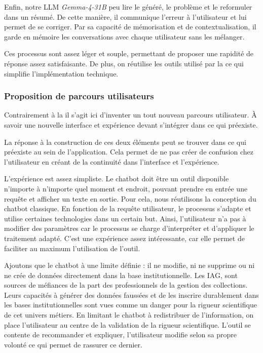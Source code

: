 Enfin, notre \gls{LLM} \textit{Gemma-4-31B} peu lire le \J généré,  le problème et le reformuler dans un résumé. De cette manière, il communique l'erreur à l'utilisateur et lui permet de se corriger. Par sa capacité de mémorisation et de contextualisation, il garde en mémoire les conversations avec chaque utilisateur sans les mélanger.\newline

Ces processus sont assez léger et souple, permettant de proposer une rapidité de réponse assez satisfaisante. De plus, on réutilise les outils utilisé par la  ce qui simplifie l'implémentation technique. 

\subsubsection{Proposition de parcours utilisateurs}

Contrairement à la  il s'agit ici d'inventer un tout nouveau parcours utilisateur. À savoir une nouvelle interface et expérience devant s'intégrer dans ce qui préexiste. 

La réponse à la construction de ces deux éléments peut se trouver dans ce qui préexiste au sein de l'application. Cela permet de ne pas créer de confusion chez l'utilisateur en créant de la continuité dans l'interface et l'expérience.\newline

L'expérience est assez simpliste. Le \gls{chatbot} doit être un outil disponible n'importe à n'importe quel moment et endroit, pouvant prendre en entrée une requête et afficher un texte en sortie. Pour cela, nous réutilisons la conception du \gls{chatbot} classique. En fonction de la requête utilisateur, le processus s'adapte et utilise certaines technologies dans un certain but. Ainsi, l'utilisateur n'a pas à modifier des paramètres car le processus se charge d'interpréter et d'appliquer le traitement adapté. C'est une expérience assez intéressante, car elle permet de faciliter au maximum l'utilisation de l'outil.

Ajoutons que le \gls{chatbot} à une limite définie : il ne modifie, ni ne supprime ou ni ne crée de données directement dans la base institutionnelle. Les \gls{IAG}, sont sources de méfiances de la part des professionnels de la gestion des collections. Leurs capacités à générer des données faussées et de les inscrire durablement dans les bases institutionnelles sont vues comme un danger pour la rigueur scientifique de cet univers métiers. En limitant le \gls{chatbot} à redistribuer de l'information, on place l'utilisateur au centre de la validation de la rigueur scientifique. L'outil se contente de recommander et expliquer, l'utilisateur modifie selon sa propre volonté ce qui permet de rassurer ce dernier.

